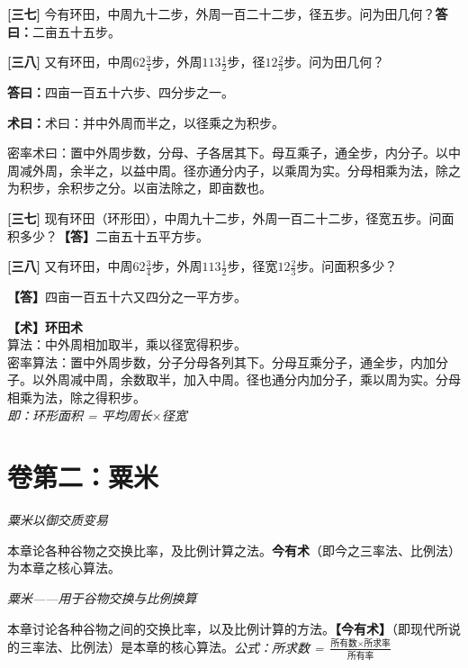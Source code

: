 \documentclass[10pt,a4paper]{article}
\newlength{\lw}
\newlength{\rw}
\newcommand{\biling}[2]{%
  \par\vspace{0.2em}%
  \noindent%
  \colorbox{classicalbg}{\parbox{\dimexpr\lw-2\fboxsep\relax}{#1}}%
  \hfill%
  \colorbox{modernbg}{\parbox{\dimexpr\rw-2\fboxsep\relax}{#2}}%
  \vspace{0.2em}%
}
\newcommand{\bilingc}[2]{%
  \par\vspace{0.1em}%
  \noindent\begin{minipage}[t]{\lw}
  {\small #1}
  \end{minipage}%
  \hfill%
  \begin{minipage}[t]{\rw}
  {\small #2}
  \end{minipage}%
  \vspace{0.1em}%
}
\newcommand{\da}{\textbf{\textcolor{answercolor}{答曰：}}}
\newcommand{\daB}{\textbf{\textcolor{answercolor}{【答】}}}
\newcommand{\shu}{\textbf{\textcolor{methodcolor}{术曰：}}}
\newcommand{\shuB}{\textbf{\textcolor{methodcolor}{【术】}}}
\newcommand{\pn}[1]{\textbf{[#1]}}
\begin{document}
\vspace{0.3em}

\bilingc{
\pn{三七} 今有环田，中周九十二步，外周一百二十二步，径五步。问为田几何？\quad\da 二亩五十五步。

\pn{三八} 又有环田，中周$62\frac34$步，外周$113\frac12$步，径$12\frac23$步。问为田几何？

\da 四亩一百五十六步、四分步之一。

\shu 术曰：并中外周而半之，以径乘之为积步。

密率术曰：置中外周步数，分母、子各居其下。母互乘子，通全步，内分子。以中周减外周，余半之，以益中周。径亦通分内子，以乘周为实。分母相乘为法，除之为积步，余积步之分。以亩法除之，即亩数也。
}{
\pn{三七} 现有环田（环形田），中周九十二步，外周一百二十二步，径宽五步。问面积多少？\quad\daB 二亩五十五平方步。

\pn{三八} 又有环田，中周$62\frac{3}{4}$步，外周$113\frac{1}{2}$步，径宽$12\frac{2}{3}$步。问面积多少？

\daB 四亩一百五十六又四分之一平方步。

\shuB \textbf{环田术}\\算法：中外周相加取半，乘以径宽得积步。\\密率算法：置中外周步数，分子分母各列其下。分母互乘分子，通全步，内加分子。以外周减中周，余数取半，加入中周。径也通分内加分子，乘以周为实。分母相乘为法，除之得积步。\\\textit{即：环形面积 = 平均周长$\times$径宽}
}

\newpage


\section{卷第二：粟米}
\label{sec:sumi}

\biling{
\begin{center}\textit{粟米以御交质变易}\end{center}

本章论各种谷物之交换比率，及比例计算之法。\textbf{今有术}（即今之三率法、比例法）为本章之核心算法。
}{
\begin{center}\textit{粟米——用于谷物交换与比例换算}\end{center}

本章讨论各种谷物之间的交换比率，以及比例计算的方法。\textbf{【今有术】}（即现代所说的三率法、比例法）是本章的核心算法。\textit{公式：所求数 = $\frac{\text{所有数}\times\text{所求率}}{\text{所有率}}$}
}
\end{document}
